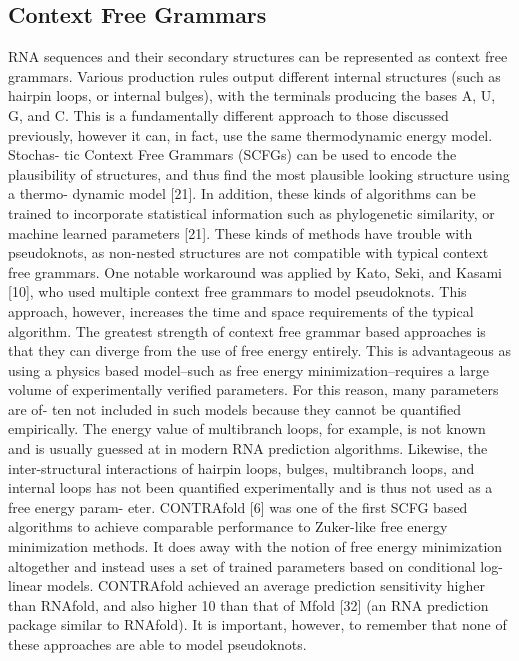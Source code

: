 \documentclass{cshonours}
\begin{document}
\subsection{Context Free Grammars}
RNA sequences and their secondary structures can be represented as context free
grammars. Various production rules output different internal structures (such as
hairpin loops, or internal bulges), with the terminals producing the bases A, U, G,
and C. This is a fundamentally different approach to those discussed previously,
however it can, in fact, use the same thermodynamic energy model. Stochas-
tic Context Free Grammars (SCFGs) can be used to encode the plausibility of
structures, and thus find the most plausible looking structure using a thermo-
dynamic model [21]. In addition, these kinds of algorithms can be trained to
incorporate statistical information such as phylogenetic similarity, or machine
learned parameters [21]. These kinds of methods have trouble with pseudoknots,
as non-nested structures are not compatible with typical context free grammars.
One notable workaround was applied by Kato, Seki, and Kasami [10], who used
multiple context free grammars to model pseudoknots. This approach, however,
increases the time and space requirements of the typical algorithm.
The greatest strength of context free grammar based approaches is that they
can diverge from the use of free energy entirely. This is advantageous as using
a physics based model–such as free energy minimization–requires a large volume
of experimentally verified parameters. For this reason, many parameters are of-
ten not included in such models because they cannot be quantified empirically.
The energy value of multibranch loops, for example, is not known and is usually
guessed at in modern RNA prediction algorithms. Likewise, the inter-structural
interactions of hairpin loops, bulges, multibranch loops, and internal loops has
not been quantified experimentally and is thus not used as a free energy param-
eter. CONTRAfold [6] was one of the first SCFG based algorithms to achieve
comparable performance to Zuker-like free energy minimization methods. It does
away with the notion of free energy minimization altogether and instead uses a
set of trained parameters based on conditional log-linear models. CONTRAfold
achieved an average prediction sensitivity higher than RNAfold, and also higher
10
than that of Mfold [32] (an RNA prediction package similar to RNAfold). It
is important, however, to remember that none of these approaches are able to
model pseudoknots.
\end{document}
